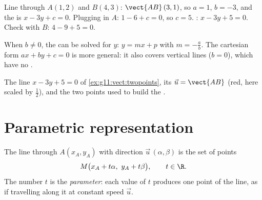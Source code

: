 \begin{example}\label{ex:g11:vect:twopoints}
Line through $A(1, 2)$ and $B(4, 3)$: $\vect{AB}\,(3, 1)$, so
$a = 1$, $b = -3$, and the  is $x - 3y + c = 0$. Plugging in $A$:
$1 - 6 + c = 0$, so $c = 5$. : $x - 3y + 5 = 0$. Check with $B$:
$4 - 9 + 5 = 0$.
\end{example}

\begin{remark}
When $b \neq 0$, the  can be solved for $y$: $y = mx + p$ with
 $m = -\frac ab$. The cartesian form $ax + by + c = 0$ is more
general: it also covers vertical lines ($b = 0$), which have no .
\end{remark}

\begin{omfigure}

{\small The line $x - 3y + 5 = 0$ of \cref{ex:g11:vect:twopoints}, its
 $\vec u = \vect{AB}$ (red, here scaled by $\frac12$),
and the two points used to build the .}
\end{omfigure}

\section{Parametric representation}

\begin{definition}\label{def:g11:vect:parametric}
The line through $A(x_A, y_A)$ with direction $\vec u\,(\alpha, \beta)$ is
the set of points
\[
M\bigl(x_A + t\alpha,\ y_A + t\beta\bigr), \qquad t \in \R .
\]
The number $t$ is the \emph{parameter}: each value of $t$ produces one
point of the line, as if travelling along it at constant speed $\vec u$.
\end{definition}

